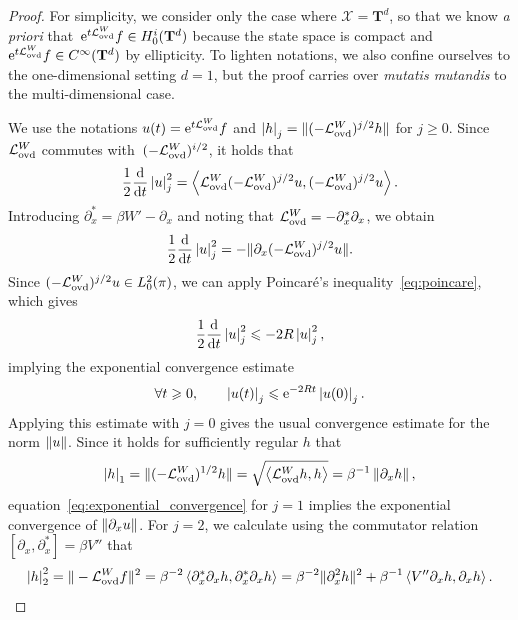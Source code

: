 \documentclass[11pt,a4paper]{article}
\newcommand{\e}{\mathrm{e}}
\newcommand{\commut}[2]{[#1, #2]}
\newcommand{\torus}{\mathbf T}
\theoremstyle{plain}
\numberwithin{equation}{section}
\renewcommand{\leq}{\leqslant}
\renewcommand{\geq}{\geqslant}
\begin{document}
\begin{proof}
    For simplicity, we consider only the case where $\mathcal X = \torus^d$,
    so that we know \emph{a priori} that~$\e^{t \mathcal L_{\rm ovd}^W} f \in H^i_0(\torus^d)$ because
    the state space is compact and $\e^{t \mathcal L_{\rm ovd}^W} f \in C^{\infty}(\torus^d)$ by ellipticity.
    To lighten notations,
    we also confine ourselves to the one-dimensional setting $d = 1$,
    but the proof carries over \emph{mutatis mutandis} to the multi-dimensional case.

    We use the notations $u(t) = \e^{t \mathcal L_{\rm ovd}^W} f$ and
     $\seminorm{h}_j = \norm*{(- \mathcal L_{\rm ovd}^W)^{j/2} h}$ for $j \geq 0$.
    Since $\mathcal L_{\rm ovd}^W$ commutes with~$(-\mathcal L_{\rm ovd}^W)^{i/2}$,
    it holds that
    \[
        \frac{1}{2} \derivative*{1}{t} \seminorm{u}_j^2 = \ip{\mathcal L_{\rm ovd}^W (-\mathcal L_{\rm ovd}^W)^{j/2} u}{(- \mathcal L_{\rm ovd}^W)^{j/2} u}.
    \]
    Introducing $\partial_x^* = \beta W' - \partial_x$
    and noting that $\mathcal L_{\rm ovd}^W = - \partial_x^* \partial_x$,
    we obtain
    \[
        \frac{1}{2} \derivative*{1}{t} \seminorm{u}_j^2 = - \norm*{\partial_x (-\mathcal L_{\rm ovd}^W)^{j/2} u}.
    \]
    Since $(-\mathcal L_{\rm ovd}^W)^{j/2} u \in L^2_0(\pi)$,
    we can apply Poincar\'e's inequality~\eqref{eq:poincare},
    which gives
    \[
        \frac{1}{2} \derivative*{1}{t} \seminorm{u}_j^2 \leq - 2R \seminorm{u}_j^2,
    \]
    implying the exponential convergence estimate
    \begin{equation}
        \label{eq:exponential_convergence}
        \forall t \geq 0, \qquad
        \seminorm{u(t)}_j \leq \e^{- 2 R t} \seminorm{u(0)}_j.
    \end{equation}
    Applying this estimate with $j = 0$ gives the usual convergence estimate for the norm $\norm{u}$.
    Since it holds for sufficiently regular $h$ that
    \[
        \seminorm{h}_1 = \norm*{(- \mathcal L_{\rm ovd}^W)^{1/2} h} = \sqrt{\ip{\mathcal L_{\rm ovd}^W h}{h}} = \beta^{-1} \norm{\partial_x h},
    \]
    equation~\eqref{eq:exponential_convergence} for $j = 1$ implies the exponential convergence of $\norm{\partial_x u}$.
    For $j = 2$, we calculate using the commutator relation $\commut{\partial_x}{\partial_x^*} = \beta V''$ that
    \[
        \seminorm{h}_2^2 = \norm*{- \mathcal L_{\rm ovd}^Wf}^2
        = \beta^{-2} \ip{\partial_x^* \partial_x h}{\partial_x^* \partial_x h}
        = \beta^{-2} \norm*{\partial_x^2 h}^2 + \beta^{-1} \ip{V'' \partial_x h}{\partial_x h}.
\]
\end{proof}
\end{document}
